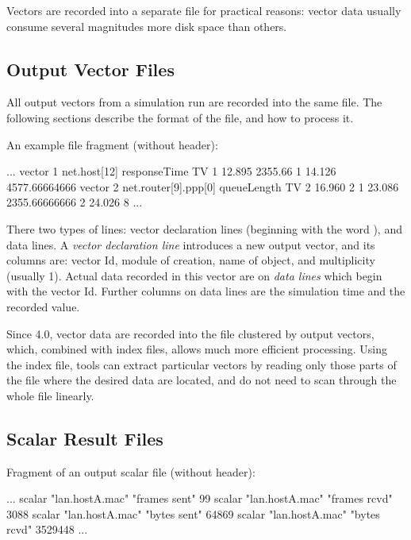 
Vectors are recorded into a separate file for practical reasons: vector
data usually consume several magnitudes more disk space than others.

\subsection{Output Vector Files}

All output vectors from a simulation run are recorded into the same file.
The following sections describe the format of the file, and
how to process it.

An example file fragment (without header):

\begin{filelisting}
...
vector 1   net.host[12]  responseTime  TV
1  12.895  2355.66
1  14.126  4577.66664666
vector 2   net.router[9].ppp[0] queueLength  TV
2  16.960  2
1  23.086  2355.66666666
2  24.026  8
...
\end{filelisting}

There two types of lines: vector declaration lines (beginning with the word
), and data lines. A \textit{vector declaration line}
introduces a new output vector, and its columns are: vector Id, module of
creation, name of  object, and multiplicity (usually 1).
Actual data recorded in this vector are on \textit{data lines} which begin
with the vector Id. Further columns on data lines are the simulation time
and the recorded value.


Since {\opp} 4.0, vector data are recorded into the file clustered by
output vectors, which, combined with index files, allows much more
efficient processing. Using the index file, tools can extract particular
vectors by reading only those parts of the file where the desired data are
located, and do not need to scan through the whole file linearly.


\subsection{Scalar Result Files}

Fragment of an output scalar file (without header):

\begin{filelisting}
...
scalar "lan.hostA.mac" "frames sent"  99
scalar "lan.hostA.mac" "frames rcvd"  3088
scalar "lan.hostA.mac" "bytes sent"   64869
scalar "lan.hostA.mac" "bytes rcvd"   3529448
...
\end{filelisting}

